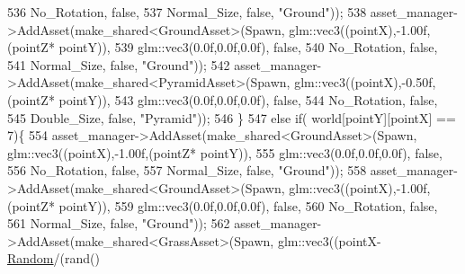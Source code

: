 \begin{DoxyCode}
536                                                              No\_Rotation, \textcolor{keyword}{false},
537                                                              Normal\_Size, \textcolor{keyword}{false}, \textcolor{stringliteral}{"Ground"}));
538             asset\_manager->AddAsset(make\_shared<GroundAsset>(Spawn, glm::vec3((pointX),-1.00f,(pointZ*
      pointY)),
539                                                              glm::vec3(0.0f,0.0f,0.0f), \textcolor{keyword}{false},
540                                                              No\_Rotation, \textcolor{keyword}{false},
541                                                              Normal\_Size, \textcolor{keyword}{false}, \textcolor{stringliteral}{"Ground"}));
542             asset\_manager->AddAsset(make\_shared<PyramidAsset>(Spawn, glm::vec3((pointX),-0.50f,(pointZ*
      pointY)),
543                                                               glm::vec3(0.0f,0.0f,0.0f), \textcolor{keyword}{false},
544                                                               No\_Rotation, \textcolor{keyword}{false},
545                                                               Double\_Size, \textcolor{keyword}{false}, \textcolor{stringliteral}{"Pyramid"}));
546    \}
547     \textcolor{keywordflow}{else} \textcolor{keywordflow}{if}( world[pointY][pointX] == 7)\{
554             asset\_manager->AddAsset(make\_shared<GroundAsset>(Spawn, glm::vec3((pointX),-1.00f,(pointZ*
      pointY)),
555                                                              glm::vec3(0.0f,0.0f,0.0f), \textcolor{keyword}{false},
556                                                              No\_Rotation, \textcolor{keyword}{false},
557                                                              Normal\_Size, \textcolor{keyword}{false}, \textcolor{stringliteral}{"Ground"}));
558             asset\_manager->AddAsset(make\_shared<GroundAsset>(Spawn, glm::vec3((pointX),-1.00f,(pointZ*
      pointY)),
559                                                              glm::vec3(0.0f,0.0f,0.0f), \textcolor{keyword}{false},
560                                                              No\_Rotation, \textcolor{keyword}{false},
561                                                              Normal\_Size, \textcolor{keyword}{false}, \textcolor{stringliteral}{"Ground"}));
562             asset\_manager->AddAsset(make\_shared<GrassAsset>(Spawn, glm::vec3((pointX-
      \hyperlink{class_game_world_a56652cc9880b3ba1be61395066c863c3}{Random}/(rand() %

\end{DoxyCode}
